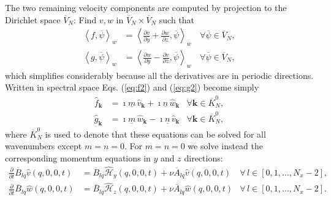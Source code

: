 \documentclass[11pt, oneside]{article}
\newcommand{\D}[1]{\overline{#1}}
\begin{document}
The two remaining velocity components are computed by projection to the 
Dirichlet space $\D{V}_N$: Find 
${v}, {w}$ in $\D{V}_N \times \D{V}_N$ such that
\begin{align}
\left<f, \D{\psi}\right>_w &= \left<\frac{\partial v}{\partial y} + 
\frac{\partial w}{\partial z}, \D{\psi}\right>_w \, &\forall \D{\psi} \in 
\D{V}_N, \label{eq:f2} \\
\left<g, \D{\psi}\right>_w &= \left<\frac{\partial w}{\partial y}  - 
\frac{\partial v}{\partial z}, \D{\psi}\right>_w \, &\forall \D{\psi} \in 
\D{V}_N, \label{eq:g2}
\end{align}
which simplifies considerably because all the derivatives are in periodic 
directions. Written in spectral space Eqs. (\ref{eq:f2}) and (\ref{eq:g2}) 
become simply
\begin{align}
\hat{f}_{\bm{k}} &= \imath \underline{m}\, \hat{v}_{\bm{k}} + \imath 
\underline{n}\, \hat{w}_{\bm{k}} &\forall \bm{k} \in \D{K}_N^0, \label{eq:f3} \\
\hat{g}_{\bm{k}} &= \imath \underline{m}\, \hat{w}_{\bm{k}} - \imath 
\underline{n}\, \hat{v}_{\bm{k}} & \forall \bm{k} \in \D{K}_N^0, \label{eq:g3}
\end{align}
where $\D{K}_N^0$ is used to denote that these equations can be solved for all 
wavenumbers except $m=n=0$. For $m=n=0$ we solve instead the 
corresponding momentum equations in $y$ and $z$ directions:
\begin{align}
\frac{\partial }{\partial t} \D{B}_{lq}\hat{v}(q, 0, 0, t) &= 
\D{B}_{lq}\hat{\mathcal{H}}_y(q, 0, 0, t) + \nu \D{A}_{lq} \hat{v}(q, 0, 0, t) 
& \forall\, l \in [0, 1, 
\ldots, N_x-2], \label{eq:v0}\\
\frac{\partial }{\partial t} \D{B}_{lq}\hat{w}(q, 0, 0, t) &= 
\D{B}_{lq}\hat{\mathcal{H}}_z(q, 0, 0, t) + \nu \D{A}_{lq} \hat{w}(q, 0, 0, t) 
& \forall\, l \in [0, 1, \ldots, N_x-2].\label{eq:w0}
\end{align}
\end{document}
